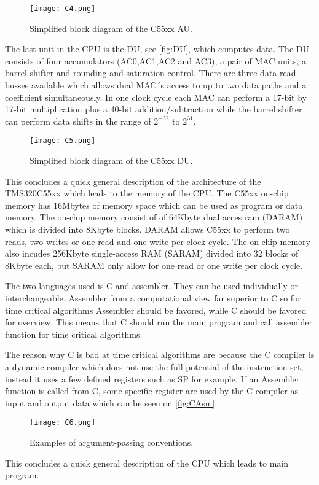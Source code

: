 \begin{figure}[H]
\centering
\texttt{[image: C4.png]}
\label{fig:AU}
\caption{Simplified block diagram of the C55xx AU.}
\end{figure}
The last unit in the CPU is the DU, see \autoref{fig:DU}, which computes data. The DU consists of four accumulators (AC0,AC1,AC2 and AC3), a pair of MAC units, a barrel shifter and rounding and saturation control. There are three data read busses available which allows dual MAC´s access to up to two data paths and a coefficient simultaneously. In one clock cycle each MAC can perform a 17-bit by 17-bit multiplication plus a 40-bit addition/subtraction while the barrel shifter can perform data shifts in the range of $2^{-32}$ to $2^{31}$. 
\begin{figure}[H]
\centering
\texttt{[image: C5.png]}
\label{fig:DU}
\caption{Simplified block diagram of the C55xx DU.}
\end{figure}
This concludes a quick general description of the architecture of the TMS320C55xx which leads to the memory of the CPU. The C55xx on-chip memory has 16Mbytes of memory space which can be used as program or data memory. The on-chip memory consist of of 64Kbyte dual acces ram (DARAM) which is divided into 8Kbyte blocks. DARAM allows C55xx to perform two reads, two writes or one read and one write per clock cycle. The on-chip memory also incudes 256Kbyte single-access RAM (SARAM) divided into 32 blocks of 8Kbyte each, but SARAM only allow for one read or one write per clock cycle.

The two languages used is C and assembler. They can be used individually or interchangeable. Assembler from a computational view far superior to C so for time critical algorithms Assembler should be favored, while C should be favored for overview. This means that C should run the main program and call assembler function for time critical algorithms. 

The reason why C is bad at time critical algorithms are because the C compiler is a dynamic compiler which does not use the full potential of the instruction set, instead it uses a few defined registers such as SP for example. If an Assembler function is called from C, some specific register are used by the C compiler as input and output data which can be seen on \autoref{fig:CAsm}.
\begin{figure}[H]
\centering
\texttt{[image: C6.png]}
\label{fig:CAsm}
\caption{Examples of argument-passing conventions.}
\end{figure}
This concludes a quick general description of the CPU which leads to main program.
